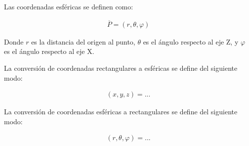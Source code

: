 Las coordenadas esféricas se definen como:

\begin{eqnarray*}
  \overline{P} = \left(r,\theta,\varphi\right)
\end{eqnarray*}

Donde ${r}$ es la distancia del origen al punto, ${\theta}$ es el ángulo respecto al eje Z, y ${\varphi}$ es el ángulo respecto al eje X.

La conversión de coordenadas rectangulares a esféricas se define del siguiente modo:

\begin{eqnarray*}
  \left(x,y,z\right) = ...
\end{eqnarray*}

La conversión de coordenadas esféricas a rectangulares se define del siguiente modo:

\begin{eqnarray*}
  \left(r,\theta,\varphi\right) = ...
\end{eqnarray*}
